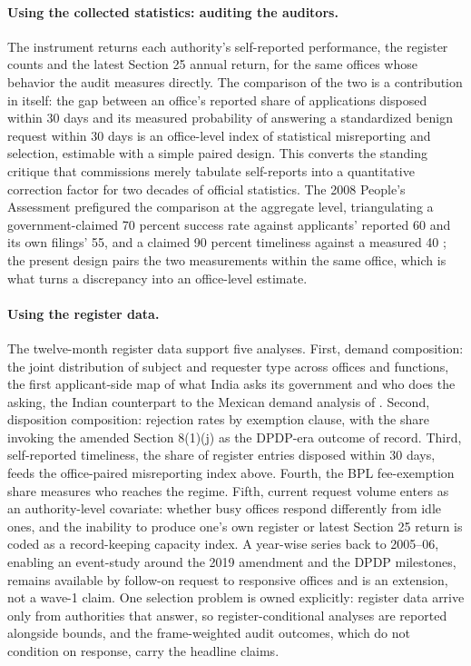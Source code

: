 \documentclass[11pt]{article}
\begin{document}
\paragraph{Using the collected statistics: auditing the auditors.} The instrument returns each authority's self-reported performance, the register counts and the latest Section 25 annual return, for the same offices whose behavior the audit measures directly. The comparison of the two is a contribution in itself: the gap between an office's reported share of applications disposed within 30 days and its measured probability of answering a standardized benign request within 30 days is an office-level index of statistical misreporting and selection, estimable with a simple paired design. This converts the standing critique that commissions merely tabulate self-reports \citep{sns2025} into a quantitative correction factor for two decades of official statistics. The 2008 People's Assessment prefigured the comparison at the aggregate level, triangulating a government-claimed 70 percent success rate against applicants' reported 60 and its own filings' 55, and a claimed 90 percent timeliness against a measured 40 \citep{raag2009}; the present design pairs the two measurements within the same office, which is what turns a discrepancy into an office-level estimate.

\paragraph{Using the register data.} The twelve-month register data support five analyses. First, demand composition: the joint distribution of subject and requester type across offices and functions, the first applicant-side map of what India asks its government and who does the asking, the Indian counterpart to the Mexican demand analysis of \citet{berliner2018}. Second, disposition composition: rejection rates by exemption clause, with the share invoking the amended Section 8(1)(j) as the DPDP-era outcome of record. Third, self-reported timeliness, the share of register entries disposed within 30 days, feeds the office-paired misreporting index above. Fourth, the BPL fee-exemption share measures who reaches the regime. Fifth, current request volume enters as an authority-level covariate: whether busy offices respond differently from idle ones, and the inability to produce one's own register or latest Section 25 return is coded as a record-keeping capacity index. A year-wise series back to 2005--06, enabling an event-study around the 2019 amendment and the DPDP milestones, remains available by follow-on request to responsive offices and is an extension, not a wave-1 claim. One selection problem is owned explicitly: register data arrive only from authorities that answer, so register-conditional analyses are reported alongside bounds, and the frame-weighted audit outcomes, which do not condition on response, carry the headline claims.
\end{document}
